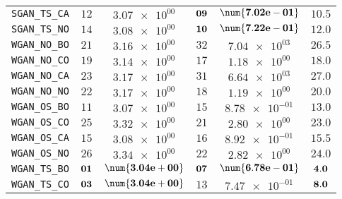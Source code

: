 \begin{table}[H]
\begin{tabularx}{\textwidth}{l||CC|CC||c}
		\texttt{SGAN\_TS\_CA} & $ 12$ & $ \num{3.07e+00}$ & $\bf 09$ & $\bf \num{7.02e-01}$ &$ 10.5$  \\
		\texttt{SGAN\_TS\_NO} & $ 14$ & $ \num{3.08e+00}$ & $\bf 10$ & $\bf \num{7.22e-01}$ &$ 12.0$  \\ \hline
		\texttt{WGAN\_NO\_BO} & $ 21$ & $ \num{3.16e+00}$ & $ 32$ & $ \num{7.04e+03}$ &$ 26.5$  \\
		\texttt{WGAN\_NO\_CO} & $ 19$ & $ \num{3.14e+00}$ & $ 17$ & $ \num{1.18e+00}$ &$ 18.0$  \\
		\texttt{WGAN\_NO\_CA} & $ 23$ & $ \num{3.17e+00}$ & $ 31$ & $ \num{6.64e+03}$ &$ 27.0$  \\
		\texttt{WGAN\_NO\_NO} & $ 22$ & $ \num{3.17e+00}$ & $ 18$ & $ \num{1.19e+00}$ &$ 20.0$  \\
		\texttt{WGAN\_OS\_BO} & $ 11$ & $ \num{3.07e+00}$ & $ 15$ & $ \num{8.78e-01}$ &$ 13.0$  \\
		\texttt{WGAN\_OS\_CO} & $ 25$ & $ \num{3.32e+00}$ & $ 21$ & $ \num{2.80e+00}$ &$ 23.0$  \\
		\texttt{WGAN\_OS\_CA} & $ 15$ & $ \num{3.08e+00}$ & $ 16$ & $ \num{8.92e-01}$ &$ 15.5$  \\
		\texttt{WGAN\_OS\_NO} & $ 26$ & $ \num{3.34e+00}$ & $ 22$ & $ \num{2.82e+00}$ &$ 24.0$  \\
		\texttt{WGAN\_TS\_BO} & $\bf 01$ & $\bf \num{3.04e+00}$ & $\bf 07$ & $\bf \num{6.78e-01}$ &$\bf 4.0$  \\
		\texttt{WGAN\_TS\_CO} & $\bf 03$ & $\bf \num{3.04e+00}$ & $ 13$ & $ \num{7.47e-01}$ &$\bf 8.0$  \\

\end{tabularx}
\end{table}
